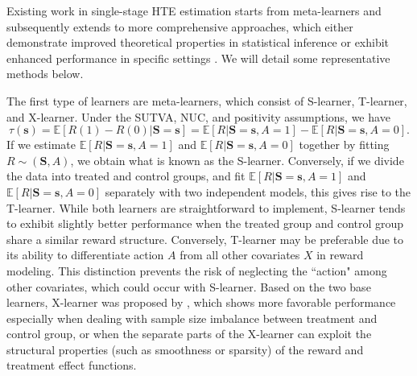Existing work in single-stage \acrshort{HTE} estimation starts from meta-learners \citep{kunzel2019metalearners} and subsequently extends to more comprehensive approaches, which either demonstrate improved theoretical properties in statistical inference \citep{kennedy2020optimal} or exhibit enhanced performance in specific settings \citep{nie2021quasi, shi2019adapting}. We will detail some representative methods below.

The first type of learners are meta-learners, which consist of S-learner, T-learner, and X-learner. Under the \acrshort{SUTVA}, \acrshort{NUC}, and positivity assumptions, we have 
\begin{equation*}
    \tau(\boldsymbol{s}) = \mathbb{E}[R(1) - R(0)|\boldsymbol{S}=\boldsymbol{s}] = \mathbb{E}[R|\boldsymbol{S} = \boldsymbol{s}, A=1] - \mathbb{E}[R|\boldsymbol{S} = \boldsymbol{s}, A=0].
\end{equation*}
If we estimate $\mathbb{E}[R|\boldsymbol{S}=\boldsymbol{s}, A=1]$ and $\mathbb{E}[R|\boldsymbol{S}=\boldsymbol{s}, A=0]$ together by fitting $R\sim (\boldsymbol{S},A)$, we obtain what is known as the S-learner. Conversely, if we divide the data into treated and control groups, and fit $\mathbb{E}[R|\boldsymbol{S} = \boldsymbol{s}, A=1]$ and $\mathbb{E}[R|\boldsymbol{S} = \boldsymbol{s}, A=0]$ separately with two independent models, this gives rise to the T-learner. While both learners are straightforward to implement, S-learner tends to exhibit slightly better performance when the treated group and control group share a similar reward structure. Conversely, T-learner may be preferable due to its ability to differentiate action $A$ from all other covariates $X$ in reward modeling. This distinction prevents the risk of neglecting the ``action" among other covariates, which could occur with S-learner. Based on the two base learners, X-learner was proposed by \citet{kunzel2019metalearners}, which shows more favorable performance especially when dealing with sample size imbalance between treatment and control group, or when the separate parts of the X-learner can exploit the structural properties (such as smoothness or sparsity) of the reward and treatment effect functions.

